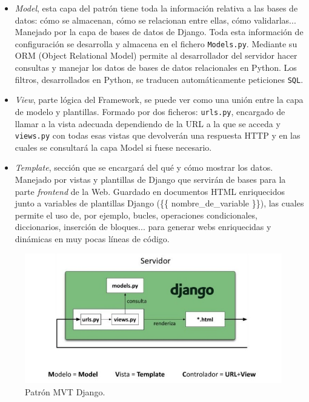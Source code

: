 \documentclass[11pt,a4paper]{book}
\begin{document}
				\begin{itemize}
					\item \textit{Model}, esta capa del patrón tiene toda la información relativa a las bases de datos: cómo se almacenan, cómo se relacionan entre ellas, cómo validarlas... Manejado por la capa de bases de datos de Django. Toda esta información de configuración se desarrolla y almacena en el fichero \texttt{Models.py}. Mediante su ORM (Object Relational Model) permite al desarrollador del servidor hacer consultas y manejar los datos de bases de datos relacionales en Python. Los filtros, desarrollados en Python, se traducen automáticamente peticiones \texttt{SQL}.\\
					
					\item \textit{View}, parte lógica del Framework, se puede ver como una unión entre la capa de modelo y plantillas. Formado por dos ficheros: \texttt{urls.py}, encargado de llamar a la vista adecuada dependiendo de la URL a la que se acceda y \texttt{views.py} con todas esas vistas que devolverán una respuesta HTTP y en las cuales se consultará la capa Model si fuese necesario.\\
					
					
					\item \textit{Template}, sección que se encargará del qué y cómo mostrar los datos. Manejado por vistas y plantillas de Django que servirán de bases para la parte \textit{frontend} de la Web. Guardado en documentos HTML enriquecidos junto a variables de plantillas Django (\{\{ nombre\_de\_variable \}\}), las cuales permite el uso de, por ejemplo, bucles, operaciones condicionales, diccionarios, inserción de bloques... para generar webs enriquecidas y dinámicas en muy pocas líneas de código.
					
				\end{itemize}
			
				\begin{figure}[H]
				 	\centering
				 	\includegraphics[width=13cm, keepaspectratio]{img/django_MTV.png}
				 	\caption{Patrón MVT Django.}
				 	\label{fig:MTV_Django}
				 \end{figure}
			 
\end{document}
